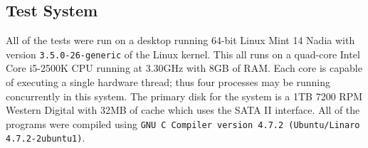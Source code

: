 \subsection{Test System}

All of the tests were run on a desktop running 64-bit Linux Mint 14 Nadia with version \texttt{3.5.0-26-generic} of the Linux kernel.  This all runs on a quad-core Intel Core i5-2500K CPU running at 3.30GHz with 8GB of RAM.  Each core is capable of executing a single hardware thread; thus four processes may be running concurrently in this system.  The primary disk for the system is a 1TB 7200 RPM Western Digital with 32MB of cache which uses the SATA II interface.  All of the programs were compiled using \texttt{GNU C Compiler version 4.7.2 (Ubuntu/Linaro 4.7.2-2ubuntu1)}.
